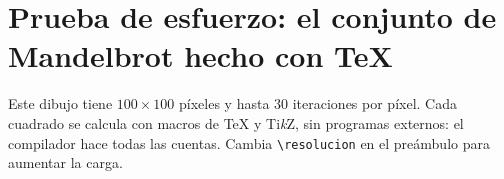 \documentclass[a4paper]{article}
\def\resolucion{100}   %
\def\iteraciones{30}  %
\def\xmin{-2.2} \def\xmax{0.8}
\def\ymin{-1.5} \def\ymax{1.5}
\def\lado{14cm}       %
\newif\ifsigue
\newcommand\mandelbrot[2]{%
  \def\zr{0}\def\zi{0}\iter=0 \siguetrue
  \loop
  \pgfmathsetmacro\zrr{\zr*\zr}%
  \pgfmathsetmacro\zii{\zi*\zi}%
  \pgfmathsetmacro\modulo{\zrr+\zii}%
  \ifdim\modulo pt>4pt \siguefalse \else
  \ifnum\iter<\iteraciones\relax
  \pgfmathsetmacro\zi{2*\zr*\zi+#2}%
  \pgfmathsetmacro\zr{\zrr-\zii+#1}%
  \advance\iter by 1
  \else \siguefalse \fi
  \fi
  \ifsigue \repeat
}
\begin{document}
\section*{Prueba de esfuerzo: el conjunto de Mandelbrot hecho con \TeX}

Este dibujo tiene \(\resolucion \times \resolucion\) píxeles y hasta
\iteraciones{} iteraciones por píxel. Cada cuadrado se calcula con macros de
\TeX{} y Ti\textit{k}Z, sin programas externos: el compilador hace todas las
cuentas. Cambia \verb|\resolucion| en el preámbulo para aumentar la carga.

\begin{center}
\end{center}
\end{document}
